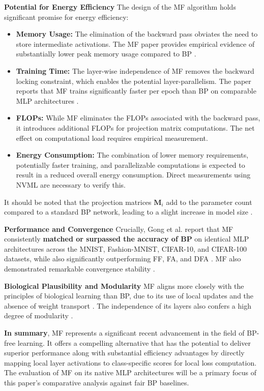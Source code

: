 \textbf{Potential for Energy Efficiency}
The design of the MF algorithm holds significant promise for energy efficiency:
\begin{itemize}
    \item \textbf{Memory Usage:} The elimination of the backward pass obviates the need to store intermediate activations. The MF paper provides empirical evidence of substantially lower peak memory usage compared to BP \cite[Fig. 1-3]{gong2025mono}.
    \item \textbf{Training Time:} The layer-wise independence of MF removes the backward locking constraint, which enables the potential layer-parallelism. The paper reports that MF trains significantly faster per epoch than BP on comparable MLP architectures \cite[Table 5]{gong2025mono}.
    \item \textbf{FLOPs:} While MF eliminates the FLOPs associated with the backward pass, it introduces additional FLOPs for projection matrix computations. The net effect on computational load requires empirical measurement.
    \item \textbf{Energy Consumption:} The combination of lower memory requirements, potentially faster training, and parallelizable computations is expected to result in a reduced overall energy consumption. Direct measurements using NVML are necessary to verify this.
\end{itemize}
It should be noted that the projection matrices $\mathbf{M}_i$ add to the parameter count compared to a standard BP network, leading to a slight increase in model size \cite{gong2025mono}.

\textbf{Performance and Convergence}
Crucially, Gong et al. \cite{gong2025mono} report that MF consistently \textbf{matched or surpassed the accuracy of BP} on identical MLP architectures across the MNIST, Fashion-MNIST, CIFAR-10, and CIFAR-100 datasets, while also significantly outperforming FF, FA, and DFA \cite[Table 3]{gong2025mono}. MF also demonstrated remarkable convergence stability \cite[Fig. 5]{gong2025mono}.

\textbf{Biological Plausibility and Modularity}
MF aligns more closely with the principles of biological learning than BP, due to its use of local updates and the absence of weight transport \cite{gong2025mono}. The independence of its layers also confers a high degree of modularity \cite[Section 3.3]{gong2025mono}.

\textbf{In summary}, MF represents a significant recent advancement in the field of BP-free learning. It offers a compelling alternative that has the potential to deliver superior performance along with substantial efficiency advantages by directly mapping local layer activations to class-specific scores for local loss computation. The evaluation of MF on its native MLP architectures will be a primary focus of this paper's comparative analysis against fair BP baselines.

